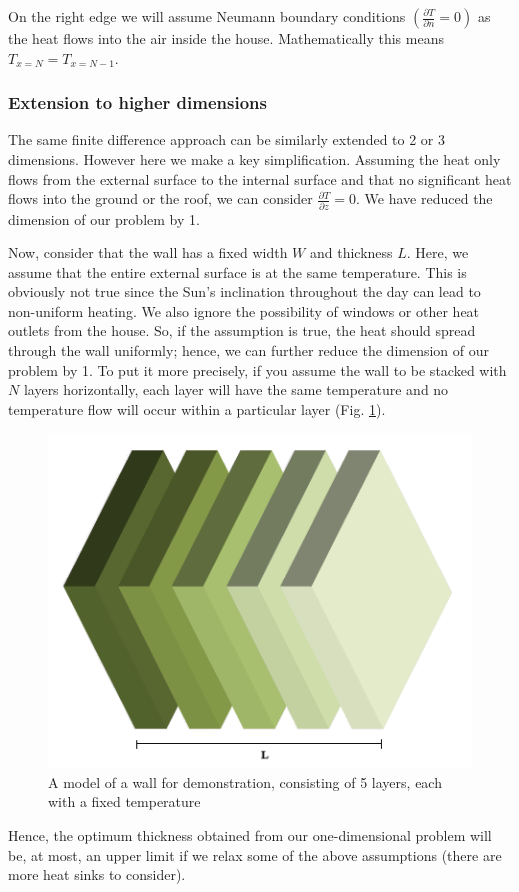 On the right edge we will assume Neumann boundary conditions $\left(\frac{\partial T}{\partial n} = 0\right)$ as the heat flows into the air inside the house. Mathematically this means $T_{x=N} = T_{x=N-1}$.

\subsubsection{Extension to higher dimensions}
The same finite difference approach can be similarly extended to 2 or 3 dimensions. However here we make a key simplification. Assuming the heat only flows from the external surface to the internal surface and that no significant heat flows into the ground or the roof, we can consider $\frac{\partial T}{\partial z} = 0$. We have reduced the dimension of our problem by 1. 

Now, consider that the wall has a fixed width $W$ and thickness $L$. Here, we assume that the entire external surface is at the same temperature. This is obviously not true since the Sun's inclination throughout the day can lead to non-uniform heating. We also ignore the possibility of windows or other heat outlets from the house. So, if the assumption is true, the heat should spread through the wall uniformly; hence, we can further reduce the dimension of our problem by 1. To put it more precisely, if you assume the wall to be stacked with $N$ layers horizontally, each layer will have the same temperature and no temperature flow will occur within a particular layer (Fig. \ref{layers}).

\begin{figure}[H]
    \centering
\includegraphics[width=0.6\linewidth]{Figures/4/layers.png}
    \caption{A model of a wall for demonstration, consisting of 5 layers, each with a fixed temperature}
    \label{layers}
\end{figure}

Hence, the optimum thickness obtained from our one-dimensional problem will be, at most, an upper limit if we relax some of the above assumptions (there are more heat sinks to consider). 

